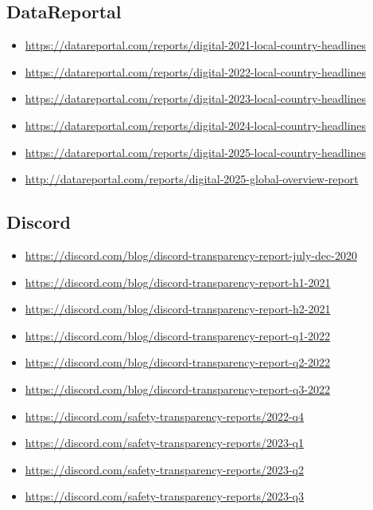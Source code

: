 {%
\subsection*{DataReportal}
{\footnotesize
\begin{itemize}
\item[]\url{https://datareportal.com/reports/digital-2021-local-country-headlines}
\item[]\url{https://datareportal.com/reports/digital-2022-local-country-headlines}
\item[]\url{https://datareportal.com/reports/digital-2023-local-country-headlines}
\item[]\url{https://datareportal.com/reports/digital-2024-local-country-headlines}
\item[]\url{https://datareportal.com/reports/digital-2025-local-country-headlines}
\item[]\url{http://datareportal.com/reports/digital-2025-global-overview-report}
\end{itemize}
}


\subsection*{Discord}
{\footnotesize
\begin{itemize}
\item[]\url{https://discord.com/blog/discord-transparency-report-july-dec-2020}
\item[]\url{https://discord.com/blog/discord-transparency-report-h1-2021}
\item[]\url{https://discord.com/blog/discord-transparency-report-h2-2021}
\item[]\url{https://discord.com/blog/discord-transparency-report-q1-2022}
\item[]\url{https://discord.com/blog/discord-transparency-report-q2-2022}
\item[]\url{https://discord.com/blog/discord-transparency-report-q3-2022}
\item[]\url{https://discord.com/safety-transparency-reports/2022-q4}
\item[]\url{https://discord.com/safety-transparency-reports/2023-q1}
\item[]\url{https://discord.com/safety-transparency-reports/2023-q2}
\item[]\url{https://discord.com/safety-transparency-reports/2023-q3}
\end{itemize}
}


}
